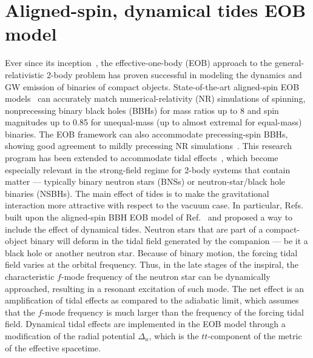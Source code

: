 \documentclass[prd,aps,letter,twocolumn,floatfix,notitlepage]{revtex4-1}
\begin{document}
\section{Aligned-spin, dynamical tides EOB model}
Ever since its inception~\cite{Buonanno:1998gg}, the effective-one-body (EOB) approach to the general-relativistic 2-body problem has proven successful in modeling the dynamics and GW emission of binaries of compact objects. State-of-the-art aligned-spin EOB models~\cite{Bohe:2016gbl,Nagar:2017jdw} can accurately match numerical-relativity (NR) simulations of spinning, nonprecessing binary black holes (BBHs) for mass ratios up to 8 and spin magnitudes up to 0.85 for unequal-mass (up to almost extremal for equal-mass) binaries. The EOB framework can also accommodate precessing-spin BBHs, showing good agreement to mildly precessing NR simulations~\cite{Babak:2016tgq}. This research program has been extended to accommodate tidal effects~\cite{Damour:2009wj,Vines:2010ca,Damour:2012yf,Bini:2012gu,Bernuzzi:2014owa,Hinderer:2016eia,Steinhoff:2016rfi,Dietrich:2017feu}, which become especially relevant in the strong-field regime for 2-body systems that contain matter --- typically binary neutron stars (BNSs) or neutron-star/black hole binaries (NSBHs). The main effect of tides is to make the gravitational interaction more attractive with respect to the vacuum case. In particular, Refs.~\cite{Hinderer:2016eia,Steinhoff:2016rfi} built upon the aligned-spin BBH EOB model of Ref.~\cite{Taracchini:2013rva} and proposed a way to include the effect of dynamical tides. Neutron stars that are part of a compact-object binary will deform in the tidal field generated by the companion --- be it a black hole or another neutron star. Because of binary motion, the forcing tidal field varies at the orbital frequency. Thus, in the late stages of the inspiral, the characteristic $f$-mode frequency of the neutron star can be dynamically approached, resulting in a resonant excitation of such mode. The net effect is an amplification of tidal effects as compared to the adiabatic limit, which assumes that the $f$-mode frequency is much larger than the frequency of the forcing tidal field. Dynamical tidal effects are implemented in the EOB model through a modification of the radial potential $\Delta_u$, which is the $tt$-component of the metric of the effective spacetime. 
\end{document}
